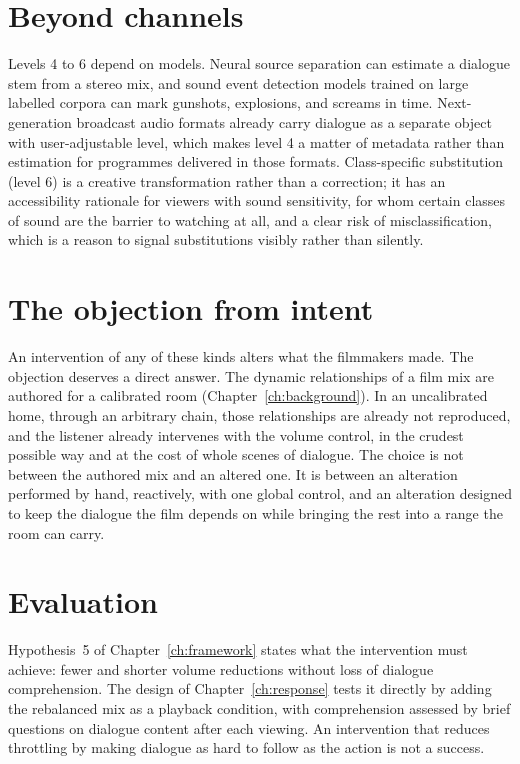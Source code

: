 \section{Beyond channels}

Levels 4 to 6 depend on models. Neural source separation can estimate a dialogue stem from a stereo mix, and sound event detection models trained on large labelled corpora \citep{gemmeke2017} can mark gunshots, explosions, and screams in time. Next-generation broadcast audio formats already carry dialogue as a separate object with user-adjustable level, which makes level 4 a matter of metadata rather than estimation for programmes delivered in those formats. Class-specific substitution (level 6) is a creative transformation rather than a correction; it has an accessibility rationale for viewers with sound sensitivity, for whom certain classes of sound are the barrier to watching at all, and a clear risk of misclassification, which is a reason to signal substitutions visibly rather than silently.

\section{The objection from intent}

An intervention of any of these kinds alters what the filmmakers made. The objection deserves a direct answer. The dynamic relationships of a film mix are authored for a calibrated room (Chapter~\ref{ch:background}). In an uncalibrated home, through an arbitrary chain, those relationships are already not reproduced, and the listener already intervenes with the volume control, in the crudest possible way and at the cost of whole scenes of dialogue. The choice is not between the authored mix and an altered one. It is between an alteration performed by hand, reactively, with one global control, and an alteration designed to keep the dialogue the film depends on while bringing the rest into a range the room can carry.

\section{Evaluation}

Hypothesis~5 of Chapter~\ref{ch:framework} states what the intervention must achieve: fewer and shorter volume reductions without loss of dialogue comprehension. The design of Chapter~\ref{ch:response} tests it directly by adding the rebalanced mix as a playback condition, with comprehension assessed by brief questions on dialogue content after each viewing. An intervention that reduces throttling by making dialogue as hard to follow as the action is not a success.
